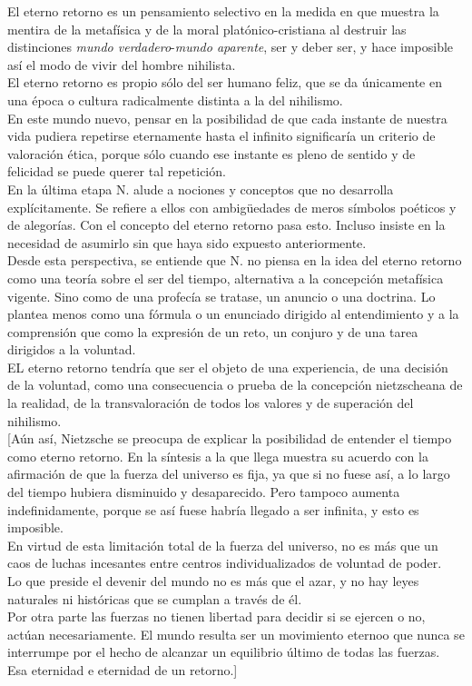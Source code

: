 \documentclass[a4paper, 10pt, twocolumn, spanish]{article}
\begin{document}
El eterno retorno es un pensamiento selectivo en la medida en que
muestra la mentira de la metafísica y de la moral platónico-cristiana
al destruir las distinciones \emph{mundo verdadero}-\emph{mundo aparente}, ser y
deber ser, y hace imposible así el modo de vivir del hombre nihilista.\\[0pt]

El eterno retorno es propio sólo del ser humano feliz, que se da
únicamente en una época o cultura radicalmente distinta a la del
nihilismo.\\[0pt]

En este mundo nuevo, pensar en la posibilidad de que cada instante de
nuestra vida pudiera repetirse eternamente hasta el infinito
significaría un criterio de valoración ética, porque sólo cuando ese
instante es pleno de sentido y de felicidad se puede querer tal
repetición.\\[0pt]

En la última etapa N. alude a nociones y conceptos que no desarrolla
explícitamente. Se refiere a ellos con ambigüedades de meros símbolos
poéticos y de alegorías. Con el concepto del eterno retorno pasa
esto. Incluso insiste en la necesidad de asumirlo sin que haya sido
expuesto anteriormente.\\[0pt]

Desde esta perspectiva, se entiende que N. no piensa en la idea del
eterno retorno como una teoría sobre el ser del tiempo, alternativa a
la concepción metafísica vigente. Sino como de una profecía se
tratase, un anuncio o una doctrina. Lo plantea menos como una fórmula
o un enunciado dirigido al entendimiento y a la comprensión que como
la expresión de un reto, un conjuro y de una tarea dirigidos a la
voluntad.\\[0pt]
EL eterno retorno tendría que ser el objeto de una experiencia, de una
decisión de la voluntad, como una consecuencia o prueba de la
concepción nietzscheana de la realidad, de la transvaloración de todos
los valores y de superación del nihilismo.\\[0pt]

[Aún así, Nietzsche se preocupa de explicar la posibilidad de entender
el tiempo como eterno retorno. En la síntesis a la que llega muestra
su acuerdo con la afirmación de que la fuerza del universo es fija, ya
que si no fuese así, a lo largo del tiempo hubiera disminuido y
desaparecido. Pero tampoco aumenta indefinidamente, porque se así
fuese habría llegado a ser infinita, y esto es imposible.\\[0pt]
En virtud de esta limitación total de la fuerza del universo, no es
más que un caos de luchas incesantes entre centros individualizados de
voluntad de poder.\\[0pt]
Lo que preside el devenir del mundo no es más que el azar, y no hay
leyes naturales ni históricas que se cumplan a través de él.\\[0pt]
Por otra parte las fuerzas no tienen libertad para decidir si se
ejercen o no, actúan necesariamente. El mundo resulta ser un
movimiento eternoo que nunca se interrumpe por el hecho de alcanzar un
equilibrio último de todas las fuerzas.\\[0pt]
Esa eternidad e eternidad de un retorno.]\\[0pt]
\end{document}
